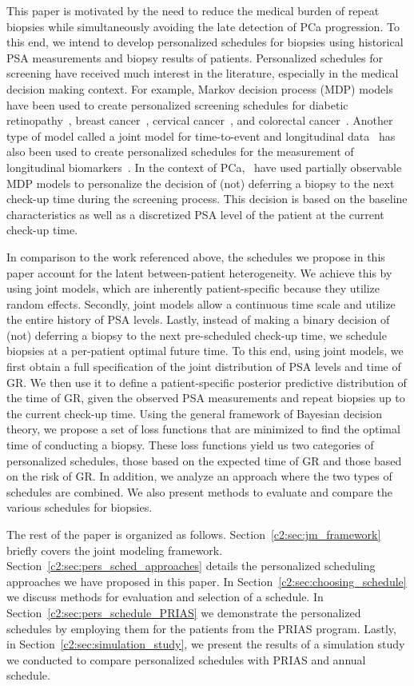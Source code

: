 This paper is motivated by the need to reduce the medical burden of repeat biopsies while simultaneously avoiding the late detection of PCa progression. To this end, we intend to develop personalized schedules for biopsies using historical PSA measurements and biopsy results of patients. Personalized schedules for screening have received much interest in the literature, especially in the medical decision making context. For example, Markov decision process (MDP) models have been used to create personalized screening schedules for diabetic retinopathy~\citep{bebu2017OptimalScreening}, breast cancer~\citep*{ayer2012or}, cervical cancer~\citep*{akhavan2017markov}, and colorectal cancer~\citep*{erenay2014optimizing}. Another type of model called a joint model for time-to-event and longitudinal data~\citep{tsiatis2004joint,rizopoulos2012joint} has also been used to create personalized schedules for the measurement of longitudinal biomarkers~\citep{drizopoulosPersScreening}. In the context of PCa,~\citet{zhang2012optimization} have used partially observable MDP models to personalize the decision of (not) deferring a biopsy to the next check-up time during the screening process. This decision is based on the baseline characteristics as well as a discretized PSA level of the patient at the current check-up time.

In comparison to the work referenced above, the schedules we propose in this paper account for the latent between-patient heterogeneity. We achieve this by using joint models, which are inherently patient-specific because they utilize random effects. Secondly, joint models allow a continuous time scale and utilize the entire history of PSA levels. Lastly, instead of making a binary decision of (not) deferring a biopsy to the next pre-scheduled check-up time, we schedule biopsies at a per-patient optimal future time. To this end, using joint models, we first obtain a full specification of the joint distribution of PSA levels and time of GR. We then use it to define a patient-specific posterior predictive distribution of the time of GR, given the observed PSA measurements and repeat biopsies up to the current check-up time. Using the general framework of Bayesian decision theory, we propose a set of loss functions that are minimized to find the optimal time of conducting a biopsy. These loss functions yield us two categories of personalized schedules, those based on the expected time of GR and those based on the risk of GR. In addition, we analyze an approach where the two types of schedules are combined. We also present methods to evaluate and compare the various schedules for biopsies.

The rest of the paper is organized as follows. Section~\ref{c2:sec:jm_framework} briefly covers the joint modeling framework. Section~\ref{c2:sec:pers_sched_approaches} details the personalized scheduling approaches we have proposed in this paper. In Section~\ref{c2:sec:choosing_schedule} we discuss methods for evaluation and selection of a schedule. In Section~\ref{c2:sec:pers_schedule_PRIAS} we demonstrate the personalized schedules by employing them for the patients from the PRIAS program. Lastly, in Section~\ref{c2:sec:simulation_study}, we present the results of a simulation study we conducted to compare personalized schedules with PRIAS and annual schedule.